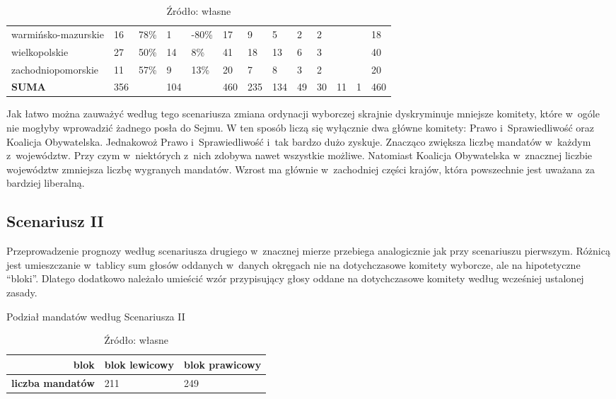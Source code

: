 \begin{table}[H]
\begin{adjustbox}{angle=90}
\begin{tabular}{l|lllll|lllllll}
warmińsko-mazurskie & 16 & {\color[HTML]{009901} 78\%} & 1 & {\color[HTML]{FE0000} -80\%} & 17 & 9 & 5 & 2 & 2 &  &  & 18 \\
wielkopolskie & 27 & {\color[HTML]{009901} 50\%} & 14 & {\color[HTML]{009901} 8\%} & 41 & 18 & 13 & 6 & 3 &  &  & 40 \\
zachodniopomorskie & 11 & {\color[HTML]{009901} 57\%} & 9 & {\color[HTML]{009901} 13\%} & 20 & 7 & 8 & 3 & 2 &  &  & 20 \\ \hline
\textbf{SUMA} & 356 &  & 104 &  & 460 & 235 & 134 & 49 & 30 & 11 & 1 & 460
\end{tabular}
\end{adjustbox}
\caption*{Źródło: własne}
\end{table}

Jak łatwo można zauważyć według tego scenariusza zmiana ordynacji wyborczej skrajnie dyskryminuje mniejsze komitety, które w~ogóle nie mogłyby wprowadzić żadnego posła do Sejmu. W ten sposób liczą się wyłącznie dwa główne komitety: Prawo i~Sprawiedliwość oraz Koalicja Obywatelska. Jednakowoż Prawo i~Sprawiedliwość i~tak bardzo dużo zyskuje. Znacząco zwiększa liczbę mandatów w~każdym z~województw. Przy czym w~niektórych z~nich zdobywa nawet wszystkie możliwe. Natomiast Koalicja Obywatelska w~znacznej liczbie województw zmniejsza liczbę wygranych mandatów. Wzrost ma głównie w~zachodniej części krajów, która powszechnie jest uważana za bardziej liberalną.

\subsection{Scenariusz II}
Przeprowadzenie prognozy według scenariusza drugiego w~znacznej mierze przebiega analogicznie jak przy scenariuszu pierwszym. Różnicą jest umieszczanie w~tablicy sum głosów oddanych w~danych okręgach nie na dotychczasowe komitety wyborcze, ale na hipotetyczne \enquote{bloki}. Dlatego dodatkowo należało umieścić wzór przypisujący głosy oddane na dotychczasowe komitety według wcześniej ustalonej zasady.

\begin{center}
\begin{table}[H]
\caption{Podział mandatów według Scenariusza II}
\centering
\begin{tabular}{r|l|l}
\centering
\textbf{blok} & \multicolumn{1}{c|}{\textbf{blok lewicowy}} & \multicolumn{1}{c}{\textbf{blok prawicowy}} \\ \hline
\textbf{liczba mandatów} & 211 & 249
\end{tabular}
\caption*{Źródło: własne}
\end{table}
\end{center}



